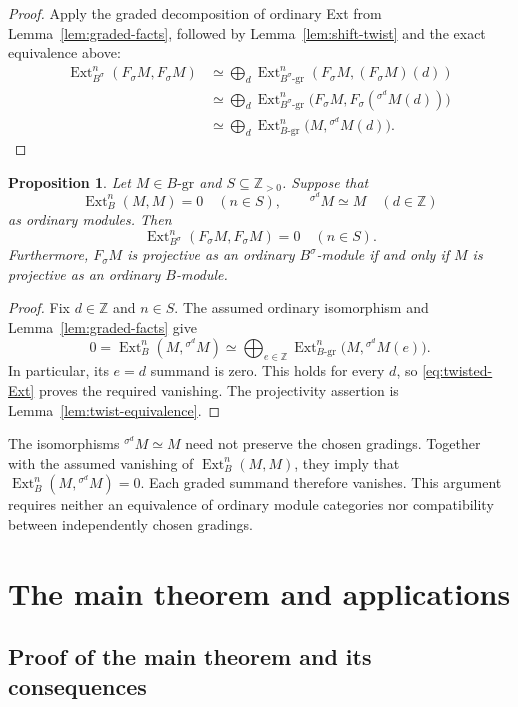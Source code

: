 \documentclass[11pt,a4paper]{article}
\numberwithin{equation}{section}
\theoremstyle{definition}
\theoremstyle{plain}
\newtheorem{proposition}[definition]{Proposition}
\theoremstyle{remark}
\DeclareMathOperator{\Ext}{Ext}
\newcommand{\Z}{\mathbb Z}
\newcommand{\gmod}[1]{#1\text{-}\mathrm{gr}}
\newcommand{\tw}[2]{{}^{#1}\!#2}
\begin{document}
\begin{proof}
Apply the graded decomposition of ordinary Ext from
Lemma~\ref{lem:graded-facts}, followed by
Lemma~\ref{lem:shift-twist} and the exact equivalence above:
\begin{align*}
 \Ext_{B^\sigma}^n(F_\sigma M,F_\sigma M)
 &\simeq\bigoplus_d
 \Ext_{\gmod{B^\sigma}}^n(F_\sigma M,(F_\sigma M)(d))\\
 &\simeq\bigoplus_d
 \Ext_{\gmod{B^\sigma}}^n
 \bigl(F_\sigma M,F_\sigma(\tw{\sigma^d}{M}(d))\bigr)\\
 &\simeq\bigoplus_d
 \Ext_{\gmod{B}}^n\bigl(M,\tw{\sigma^d}{M}(d)\bigr).
\end{align*}
\end{proof}

\begin{proposition}\label{prop:transport}
Let \(M\in\gmod{B}\) and \(S\subseteq\Z_{>0}\). Suppose that
\[
 \Ext_B^n(M,M)=0\quad(n\in S),
 \qquad \tw{\sigma^d}{M}\simeq M\quad(d\in\Z)
\]
as ordinary modules. Then
\[
 \Ext_{B^\sigma}^n(F_\sigma M,F_\sigma M)=0\quad(n\in S).
\]
Furthermore, \(F_\sigma M\) is projective as an ordinary
\(B^\sigma\)-module if and only if \(M\) is projective as an
ordinary \(B\)-module.
\end{proposition}

\begin{proof}
Fix \(d\in\Z\) and \(n\in S\). The assumed ordinary isomorphism
and Lemma~\ref{lem:graded-facts} give
\[
 0=\Ext_B^n(M,\tw{\sigma^d}{M})
 \simeq\bigoplus_{e\in\Z}
 \Ext_{\gmod{B}}^n\bigl(M,\tw{\sigma^d}{M}(e)\bigr).
\]
In particular, its \(e=d\) summand is zero. This holds for every
\(d\), so \eqref{eq:twisted-Ext} proves the required vanishing.
The projectivity assertion is Lemma~\ref{lem:twist-equivalence}.
\end{proof}

The isomorphisms \(\tw{\sigma^d}{M}\simeq M\) need not preserve
the chosen gradings. Together with the assumed vanishing of
\(\Ext_B^n(M,M)\), they imply that
\(\Ext_B^n(M,\tw{\sigma^d}{M})=0\).
Each graded summand therefore vanishes.
This argument requires neither an equivalence of ordinary module
categories nor compatibility between independently chosen gradings.

\section{The main theorem and applications}\label{sec:main}

\subsection{Proof of the main theorem and its consequences}
\end{document}
